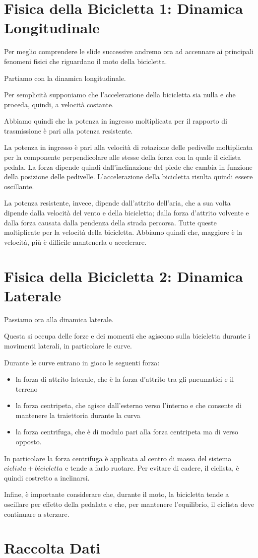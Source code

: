 \documentclass[12pt,a4paper]{article}
\begin{document}
	\section{Fisica della Bicicletta 1: Dinamica Longitudinale}
	Per meglio comprendere le slide successive andremo ora ad accennare ai principali fenomeni fisici che riguardano il moto della bicicletta.
	
	Partiamo con la dinamica longitudinale.
	
	Per semplicità supponiamo che l'accelerazione della bicicletta sia nulla e che proceda, quindi, a velocità costante.
	
	Abbiamo quindi che la potenza in ingresso moltiplicata per il rapporto di trasmissione è pari alla potenza resistente.
	
	La potenza in ingresso è pari alla velocità di rotazione delle pedivelle moltiplicata per la componente perpendicolare alle stesse della forza con la quale il ciclista pedala. La forza dipende quindi dall'inclinazione del piede che cambia in funzione della posizione delle pedivelle. L'accelerazione della bicicletta risulta quindi essere oscillante.
	
	La potenza resistente, invece, dipende dall'attrito dell'aria, che a sua volta dipende dalla velocità del vento e della bicicletta; dalla forza d'attrito volvente e dalla forza causata dalla pendenza della strada percorsa. Tutte queste moltiplicate per la velocità della bicicletta. Abbiamo quindi che, maggiore è la velocità, più è difficile mantenerla o accelerare.
	
	\section{Fisica della Bicicletta 2: Dinamica Laterale}
	Passiamo ora alla dinamica laterale.
	
	Questa si occupa delle forze e dei momenti che agiscono sulla bicicletta durante i movimenti laterali, in particolare le curve.
	
	Durante le curve entrano in gioco le seguenti forza:
	\begin{itemize}
		\item la forza di attrito laterale, che è la forza d'attrito tra gli pneumatici e il terreno
		\item la forza centripeta, che agisce dall'esterno verso l'interno e che consente di mantenere la traiettoria durante la curva
		\item la forza centrifuga, che è di modulo pari alla forza centripeta ma di verso opposto.
	\end{itemize}
	
	In particolare la forza centrifuga è applicata al centro di massa del sistema \(ciclista + bicicletta\) e tende a farlo ruotare. Per evitare di cadere, il ciclista, è quindi costretto a inclinarsi.
	
	Infine, è importante considerare che, durante il moto, la bicicletta tende a oscillare per effetto della pedalata e che, per mantenere l'equilibrio, il ciclista deve continuare a sterzare.
	
	\section{Raccolta Dati}
	
\end{document}
